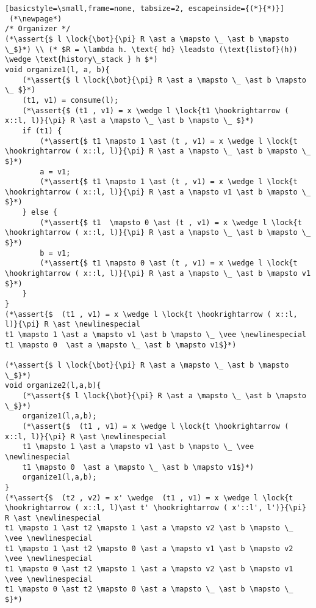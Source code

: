 \documentclass[8pt]{article}
\newcommand{\lock}[2]{ \square \hspace{-1ex} \xrightarrow[#1]{#2}}
\newcommand{\assert}[1]{\textcolor{blue}{ \{ #1 \}  } }
\newcommand{\newlinespecial}{\newline \hphantom{100pt}}
\begin{document}
\begin{lstlisting}[basicstyle=\small,frame=none, tabsize=2, escapeinside={(*}{*)}]
 (*\newpage*)
/* Organizer */
(*\assert{$ l \lock{\bot}{\pi} R \ast a \mapsto \_ \ast b \mapsto \_$}*) \\ (* $R = \lambda h. \text{ hd} \leadsto (\text{listof}(h))  \wedge \text{history\_stack } h $*)
void organize1(l, a, b){
	(*\assert{$ l \lock{\bot}{\pi} R \ast a \mapsto \_ \ast b \mapsto \_ $}*)
	(t1, v1) = consume(l);
	(*\assert{$ (t1 , v1) = x \wedge l \lock{t1 \hookrightarrow ( x::l, l)}{\pi} R \ast a \mapsto \_ \ast b \mapsto \_ $}*)
	if (t1) {
		(*\assert{$ t1 \mapsto 1 \ast (t , v1) = x \wedge l \lock{t \hookrightarrow ( x::l, l)}{\pi} R \ast a \mapsto \_ \ast b \mapsto \_ $}*)
		a = v1;
		(*\assert{$ t1 \mapsto 1 \ast (t , v1) = x \wedge l \lock{t \hookrightarrow ( x::l, l)}{\pi} R \ast a \mapsto v1 \ast b \mapsto \_ $}*)
	} else {
		(*\assert{$ t1  \mapsto 0 \ast (t , v1) = x \wedge l \lock{t \hookrightarrow ( x::l, l)}{\pi} R \ast a \mapsto \_ \ast b \mapsto \_ $}*)
		b = v1;
		(*\assert{$ t1 \mapsto 0 \ast (t , v1) = x \wedge l \lock{t \hookrightarrow ( x::l, l)}{\pi} R \ast a \mapsto \_ \ast b \mapsto v1 $}*)
	}
}
(*\assert{$  (t1 , v1) = x \wedge l \lock{t \hookrightarrow ( x::l, l)}{\pi} R \ast \newlinespecial
t1 \mapsto 1 \ast a \mapsto v1 \ast b \mapsto \_ \vee \newlinespecial
t1 \mapsto 0  \ast a \mapsto \_ \ast b \mapsto v1$}*)

(*\assert{$ l \lock{\bot}{\pi} R \ast a \mapsto \_ \ast b \mapsto \_$}*)
void organize2(l,a,b){
	(*\assert{$ l \lock{\bot}{\pi} R \ast a \mapsto \_ \ast b \mapsto \_$}*)
	organize1(l,a,b);
	(*\assert{$  (t1 , v1) = x \wedge l \lock{t \hookrightarrow ( x::l, l)}{\pi} R \ast \newlinespecial
	t1 \mapsto 1 \ast a \mapsto v1 \ast b \mapsto \_ \vee \newlinespecial
	t1 \mapsto 0  \ast a \mapsto \_ \ast b \mapsto v1$}*)
	organize1(l,a,b);
}
(*\assert{$  (t2 , v2) = x' \wedge  (t1 , v1) = x \wedge l \lock{t \hookrightarrow ( x::l, l)\ast t' \hookrightarrow ( x'::l', l')}{\pi} R \ast \newlinespecial
t1 \mapsto 1 \ast t2 \mapsto 1 \ast a \mapsto v2 \ast b \mapsto \_ \vee \newlinespecial
t1 \mapsto 1 \ast t2 \mapsto 0 \ast a \mapsto v1 \ast b \mapsto v2 \vee \newlinespecial
t1 \mapsto 0 \ast t2 \mapsto 1 \ast a \mapsto v2 \ast b \mapsto v1 \vee \newlinespecial
t1 \mapsto 0 \ast t2 \mapsto 0 \ast a \mapsto \_ \ast b \mapsto \_ $}*)
		

\end{lstlisting}
\end{document}
